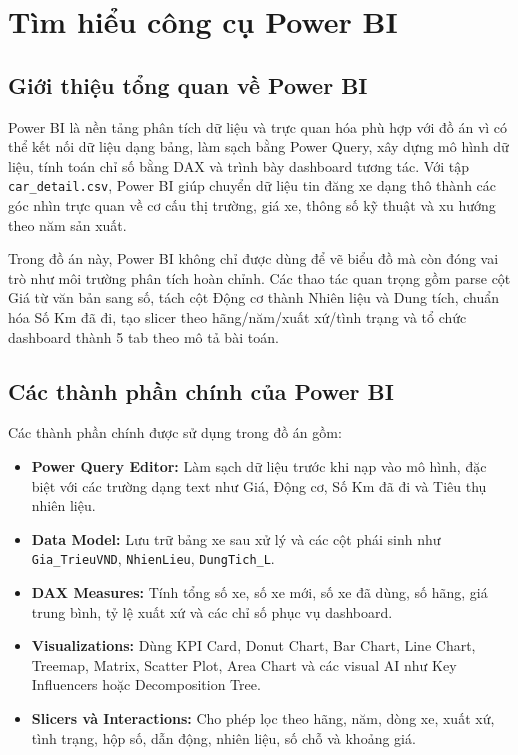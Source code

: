 \section{Tìm hiểu công cụ Power BI}

\subsection{Giới thiệu tổng quan về Power BI}

Power BI là nền tảng phân tích dữ liệu và trực quan hóa phù hợp với đồ án vì có thể kết nối dữ liệu dạng bảng, làm sạch bằng Power Query, xây dựng mô hình dữ liệu, tính toán chỉ số bằng DAX và trình bày dashboard tương tác. Với tập \texttt{car\_detail.csv}, Power BI giúp chuyển dữ liệu tin đăng xe dạng thô thành các góc nhìn trực quan về cơ cấu thị trường, giá xe, thông số kỹ thuật và xu hướng theo năm sản xuất.

Trong đồ án này, Power BI không chỉ được dùng để vẽ biểu đồ mà còn đóng vai trò như môi trường phân tích hoàn chỉnh. Các thao tác quan trọng gồm parse cột Giá từ văn bản sang số, tách cột Động cơ thành Nhiên liệu và Dung tích, chuẩn hóa Số Km đã đi, tạo slicer theo hãng/năm/xuất xứ/tình trạng và tổ chức dashboard thành 5 tab theo mô tả bài toán.

\subsection{Các thành phần chính của Power BI}

Các thành phần chính được sử dụng trong đồ án gồm:

\begin{itemize}
    \item \textbf{Power Query Editor:} Làm sạch dữ liệu trước khi nạp vào mô hình, đặc biệt với các trường dạng text như Giá, Động cơ, Số Km đã đi và Tiêu thụ nhiên liệu.
    \item \textbf{Data Model:} Lưu trữ bảng xe sau xử lý và các cột phái sinh như \texttt{Gia\_TrieuVND}, \texttt{NhienLieu}, \texttt{DungTich\_L}.
    \item \textbf{DAX Measures:} Tính tổng số xe, số xe mới, số xe đã dùng, số hãng, giá trung bình, tỷ lệ xuất xứ và các chỉ số phục vụ dashboard.
    \item \textbf{Visualizations:} Dùng KPI Card, Donut Chart, Bar Chart, Line Chart, Treemap, Matrix, Scatter Plot, Area Chart và các visual AI như Key Influencers hoặc Decomposition Tree.
    \item \textbf{Slicers và Interactions:} Cho phép lọc theo hãng, năm, dòng xe, xuất xứ, tình trạng, hộp số, dẫn động, nhiên liệu, số chỗ và khoảng giá.
\end{itemize}

